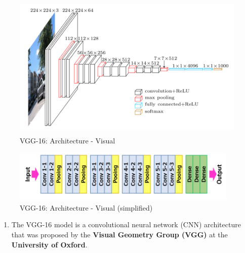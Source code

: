 \begin{figure}[h]
    \centering
    \includegraphics[width=\linewidth, height=7cm, keepaspectratio]{Pictures/convolutional-neural-network/vgg-16-1.png}
    \caption{VGG-16: Architecture - Visual}
\end{figure}
\begin{figure}[h]
    \centering
    \includegraphics[width=\linewidth, height=2.5cm, keepaspectratio]{Pictures/convolutional-neural-network/vgg-16-2.png}
    \caption{VGG-16: Architecture - Visual (simplified)}
\end{figure}

\begin{enumerate}
    \item The VGG-16 model is a convolutional neural network (CNN) architecture that was proposed by the \textbf{Visual Geometry Group (VGG)} at the \textbf{University of Oxford}.
\end{enumerate}

